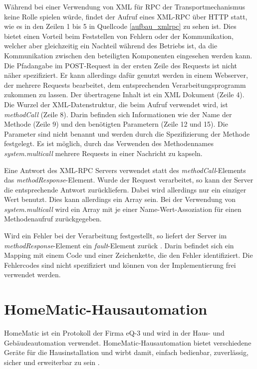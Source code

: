 Während bei einer Verwendung von XML für RPC der Transportmechanismus keine Rolle spielen würde, findet
der Aufruf eines XML-RPC über HTTP statt, wie es in den Zeilen 1 bis 5 in Quellcode \ref{aufbau_xmlrpc} zu sehen ist.
Dies bietet einen Vorteil beim Feststellen von Fehlern oder der Kommunikation, welcher aber gleichzeitig
ein Nachteil während des Betriebs ist, da die Kommunikation zwischen den beteiligten Komponenten
eingesehen werden kann.
Die Pfadangabe im POST-Request in der ersten Zeile des Requests ist nicht näher spezifiziert.
Er kann allerdings dafür genutzt werden in einem Webserver, der mehrere Requests bearbeitet, dem entsprechenden
Verarbeitungsprogramm zukommen zu lassen.
Der übertragene Inhalt ist ein XML Dokument (Zeile 4).
Die Wurzel der XML-Datenstruktur, die beim Aufruf verwendet wird, ist \emph{methodCall} (Zeile 8).
Darin befinden sich Informationen wie der Name der Methode (Zeile 9) und den benötigten Parametern (Zeile 12 und 15).
Die Parameter sind nicht benannt und werden durch die Spezifizierung der Methode festgelegt.
Es ist möglich, durch das Verwenden des Methodennames \emph{system.multicall} mehrere Requests
in einer Nachricht zu kapseln.

Eine Antwort des XML-RPC Servers verwendet statt des \emph{methodCall}-Elements das \emph{methodResponse}-Element.
Wurde der Request verarbeitet, so kann der Server die entsprechende Antwort zurückliefern.
Dabei wird allerdings nur ein einziger Wert benutzt.
Dies kann allerdings ein Array sein.
Bei der Verwendung von \emph{system.multicall} wird ein Array mit je einer Name-Wert-Assoziation
für einen Methodenaufruf zurückgegeben.

Wird ein Fehler bei der Verarbeitung festgestellt, so liefert der Server im \emph{methodResponse}-Element
ein \emph{fault}-Element zurück \cite{xmlrpc}.
Darin befindet sich ein Mapping mit einem Code und einer Zeichenkette, die den Fehler identifiziert.
Die Fehlercodes sind nicht spezifiziert und können von der Implementierung frei verwendet werden.

\section{HomeMatic-Hausautomation}
\label{gru_hm_ha}

HomeMatic ist ein Protokoll der Firma eQ-3 und wird in der Haus- und Gebäudeautomation
verwendet.
HomeMatic-Hausautomation bietet verschiedene Geräte für die Hausinstallation und wirbt damit,
einfach bedienbar, zuverlässig, sicher und erweiterbar zu sein \cite{homematic_eq3}.

